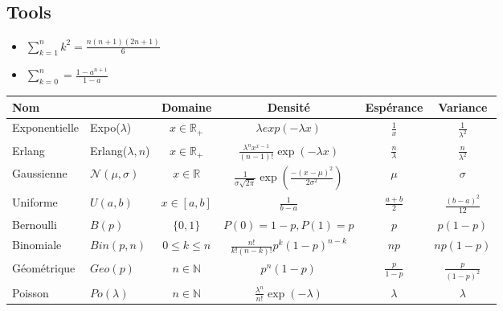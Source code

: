 \documentclass[paper=a4,fontsize=8pt,pagesize,DIV=calc]{scrartcl}
\begin{document}
\begin{multicols}{3}
\section{Tools}
\begin{itemize}
\item $\sum_{k=1}^n k^2=\frac{n(n+1)(2n+1)}{6}$
\item $\sum_{k=0}^n=\frac{1-a^{n+1}}{1-a}$
\end{itemize}








\end{multicols}

\begin{table}[H]
    \centering
    \begin{tabu} to 
    \toprule
    Nom& & Domaine & Densité & Espérance & Variance\\
     \midrule
    Exponentielle & Expo($\lambda$)& $x\in \mathbb{R}_+$ & $\lambda exp(-\lambda x)$& $\frac{1}{x}$ & $\frac{1}{\lambda^2}$\\
        Erlang & Erlang($\lambda,n$)& $x\in  \mathbb{R}_+$ & $\frac{\lambda^n x^{x-1}}{(n-1)!}\exp{(-\lambda x)}$ & $\frac{n}{\lambda}$& $\frac{n}{\lambda^2}$\\
        Gaussienne & $\mathcal{N}(\mu, \sigma)$& $x\in \mathbb{R}$& $\frac{1}{\sigma\sqrt{2\pi}}\exp{\left( \frac{-(x-\mu)^2}{2\sigma^2}\right)}$& $\mu$ & $\sigma$\\
        Uniforme & $U(a,b)$ & $x \in [a,b]$& $\frac{1}{b-a}$ & $\frac{a+b}{2}$ & $\frac{(b-a)^2}{12}$\\
        Bernoulli & $B(p)$ & $\{0,1\}$ & $P(0)=1-p,P(1)=p$& $p$ & $p(1-p)$\\
        Binomiale & $Bin(p,n)$ & $0\leq k \leq n$& $\frac{n!}{k!(n-k)!}p^k(1-p)^{n-k}$& $np$& $np(1-p)$\\
        Géométrique & $Geo(p)$ & $n\in \mathbb{N}$ & $p^n(1-p)$& $\frac{p}{1-p}$ & $\frac{p}{(1-p)^2}$\\
        Poisson & $Po(\lambda)$ & $n\in \mathbb{N}$ & $\frac{\lambda^n}{n!}\exp{(-\lambda)}$ & $\lambda$ & $\lambda$\\       
        \bottomrule
    \end{tabu}
\end{table}
\end{document}
